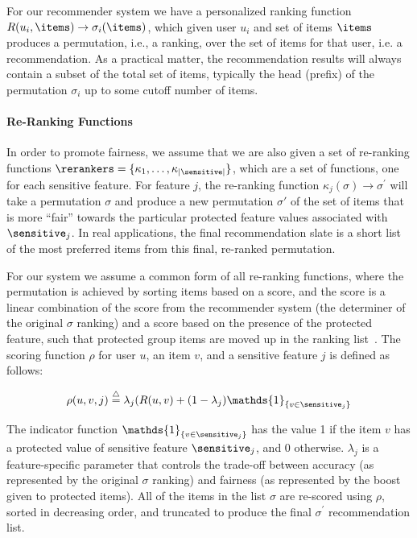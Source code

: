 For our recommender system we have a personalized ranking function $R(u_i, \items) \rightarrow \sigma_i(\items)$, which given user $u_i$ and set of items $\items$ produces a permutation, i.e., a ranking, over the set of items for that user, i.e. a recommendation. As a practical matter, the recommendation results will always contain a subset of the total set of items, typically the head (prefix) of the permutation $\sigma_i$ up to some cutoff number of items.

\noindent \paragraph{Re-Ranking Functions} \newline
\indent In order to promote fairness, we assume that we are also given a set of re-ranking functions $\rerankers = \{\kappa_1, \ldots, \kappa_{|\sensitive|}\}$, which are a set of functions, one for each sensitive feature. For feature $j$, the re-ranking function $\kappa_j(\sigma) \rightarrow \sigma^{\prime}$ will take a permutation $\sigma$ and produce a new permutation $\sigma'$ of the set of items that is more ``fair'' towards the particular protected feature values associated with $\sensitive_j$. In real applications, the final recommendation slate is a short list of the most preferred items from this final, re-ranked permutation. 

For our system we assume a common form of all re-ranking functions, where the permutation is achieved by sorting items based on a score, and the score is a linear combination of the score from the recommender system (the determiner of the original $\sigma$ ranking) and a score based on the presence of the protected feature, such that protected group items are moved up in the ranking list~\cite{adomavicius2009improving}. The scoring function $\rho$ for user $u$, an item $v$, and a sensitive feature $j$ is defined as follows:

\begin{equation}
    \rho(u, v, j) \buildrel\triangle\over= \lambda_j  (R(u,v) + (1 - \lambda_j) \mathds{1}_{\{v \in \sensitive_j\}}
\end{equation}


\noindent The indicator function $\mathds{1}_{\{v \in \sensitive_j\}}$ has the value 1 if the item $v$ has a protected value of sensitive feature $\sensitive_j$, and 0 otherwise. $\lambda_j$ is a feature-specific parameter that controls the trade-off between accuracy (as represented by the original $\sigma$ ranking) and fairness (as represented by the boost given to protected items). All of the items in the list $\sigma$ are re-scored using $\rho$, sorted in decreasing order, and truncated to produce the final $\sigma^{\prime}$ recommendation list.


